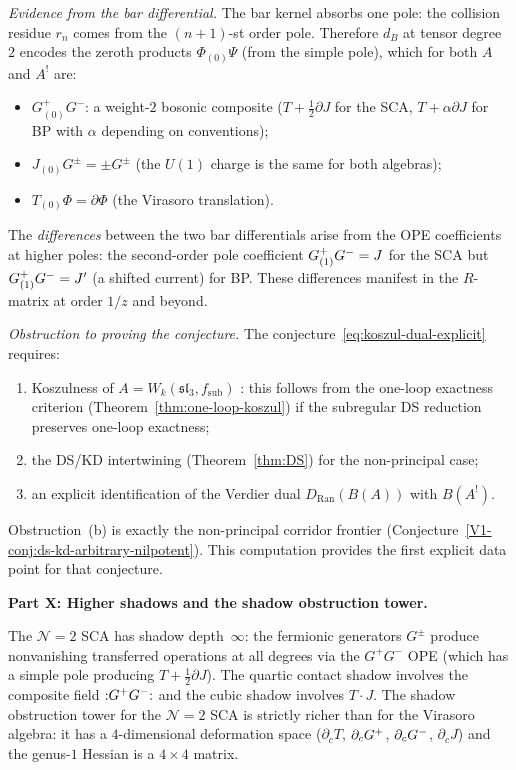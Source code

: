 \begin{computation}
\emph{Evidence from the bar differential.}
The bar kernel absorbs one pole: the collision
residue $r_n$ comes from the $(n+1)$-st order pole.
Therefore $d_B$ at tensor degree~$2$ encodes the zeroth
products $\Phi_{(0)}\Psi$ (from the simple pole),
which for both $A$ and $A^!$ are:
\begin{itemize}
\item $G^+_{(0)}G^-$: a weight-$2$ bosonic composite
($T + \frac12\partial J$ for the SCA,
$T + \alpha\partial J$ for BP with $\alpha$ depending
on conventions);
\item $J_{(0)}G^\pm = \pm G^\pm$ (the $U(1)$ charge is the
same for both algebras);
\item $T_{(0)}\Phi = \partial\Phi$ (the Virasoro translation).
\end{itemize}
The \emph{differences} between the two bar differentials
arise from the OPE coefficients at higher poles: the
second-order pole coefficient $G^+_{(1)}G^- = J$ for the
SCA but $G^+_{(1)}G^- = J'$ (a shifted current) for BP.
These differences manifest in the $R$-matrix at order
$1/z$ and beyond.

\emph{Obstruction to proving the conjecture.}
The conjecture~\eqref{eq:koszul-dual-explicit} requires:
\begin{enumerate}[label=(\alph*)]
\item Koszulness of $A=W_k(\mathfrak{sl}_3,f_{\mathrm{sub}})$
: this follows from the one-loop exactness criterion
 (Theorem~\ref{thm:one-loop-koszul}) if the subregular
 DS reduction preserves one-loop exactness;
\item the DS/KD intertwining
 (Theorem~\ref{thm:DS}) for the non-principal case;
\item an explicit identification of the Verdier dual
 $D_{\mathrm{Ran}}(B(A))$ with $B(A^!)$.
\end{enumerate}
Obstruction~(b) is exactly the non-principal corridor
frontier
(Conjecture~\ref*{V1-conj:ds-kd-arbitrary-nilpotent}).
This computation provides the first explicit data point for
that conjecture.

\medskip
\noindent\textbf{Part X: Higher shadows and the shadow obstruction tower.}

The $\mathcal N=2$ SCA has shadow depth~$\infty$:
the fermionic generators $G^\pm$ produce nonvanishing
transferred operations at all degrees via the $G^+G^-$ OPE
(which has a simple pole producing $T+\frac12\partial J$).
The quartic contact shadow involves the composite field
${:}G^+G^-{:}$ and the cubic shadow involves $T\cdot J$.
The shadow obstruction tower for the $\mathcal N=2$ SCA is strictly
richer than for the Virasoro algebra: it has a
$4$-dimensional deformation space
($\partial_c T$, $\partial_c G^+$, $\partial_c G^-$,
$\partial_c J$) and the genus-$1$ Hessian is a
$4\times 4$ matrix.


\end{computation}
